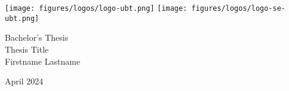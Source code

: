 \documentclass[
	pdftex,
	12pt,
	a4paper,
	parskip=relative,
	twoside,
	footinclude=false,
	footheight=0mm,
	toc=bibliography,
	toc=listof
]{scrbook}
\theoremstyle{definitiontight}
\newcommand{\thesistype}{Bachelor's Thesis} %
\newcommand{\thesistitle}{Thesis Title}
\newcommand{\studentname}{Firstname Lastname}
\newcommand{\monthyear}{April 2024}
\begin{document}

\frontmatter %

\begin{titlepage}

	\begin{center}
		\texttt{[image: figures/logos/logo-ubt.png]}	
		\hfill
		\texttt{[image: figures/logos/logo-se-ubt.png]}	
	\end{center}
	
	\vspace{4cm}
	
	\begin{center}
		{\large \thesistype}\\
		\vspace{0.5cm}
		{\LARGE\textsf{\thesistitle}}\\
		\vspace{1cm}
		{\large \studentname}\\
	\end{center}

	\vfill
		
	\begin{center}
		{\large \monthyear}
	\end{center}

\end{titlepage}

\newpage
\thispagestyle{empty}
\mbox{}
\newpage
\end{document}
